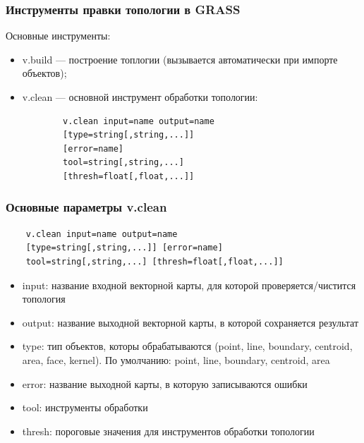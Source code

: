 
\begin{frame}[fragile]
    \frametitle{Инструменты правки топологии в GRASS}
    Основные инструменты:
    \begin{itemize}
        \item v.build --- построение топлогии (вызывается автоматически при импорте объектов);
        \item v.clean --- основной инструмент обработки топологии:
        \begin{verbatim}
        v.clean input=name output=name
        [type=string[,string,...]]
        [error=name]
        tool=string[,string,...]
        [thresh=float[,float,...]]
        \end{verbatim}
    \end{itemize}
\end{frame}

\begin{frame}[fragile]
    \frametitle{Основные параметры v.clean}
    \begin{verbatim}
    v.clean input=name output=name
    [type=string[,string,...]] [error=name]
    tool=string[,string,...] [thresh=float[,float,...]]
    \end{verbatim}
    \begin{itemize}
        \item input: название входной векторной карты, для которой проверяется/чистится топология
        \item output: название выходной векторной карты, в которой сохраняется результат
        \item type: тип объектов, которы обрабатываются (point, line, boundary, centroid, area, face, kernel). По умолчанию: point, line, boundary, centroid, area
        \item error: название выходной карты, в которую записываются ошибки
        \item tool: инструменты обработки
        \item thresh: пороговые значения для инструментов обработки топологии
    \end{itemize}
\end{frame}

